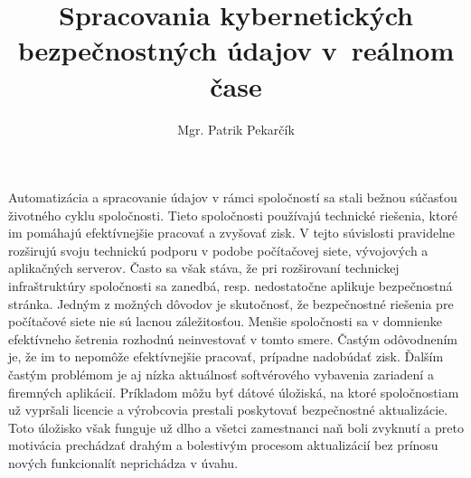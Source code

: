 \documentclass[thesismargins, thesislinespacing, openright, upjsfrontpage, combineabstracts]{rnthesis}
\title{Spracovania kybernetických bezpečnostných údajov v reálnom čase}
\author{Mgr. Patrik Pekarčík}
\begin{document}
\maketitle
\tableofcontents

\uvod



% 

Automatizácia a spracovanie údajov v rámci spoločností sa stali bežnou súčasťou životného cyklu spoločnosti. Tieto spoločnosti používajú technické riešenia, ktoré im pomáhajú efektívnejšie pracovať a zvyšovať zisk. V tejto súvislosti pravidelne rozširujú svoju technickú podporu v podobe počítačovej siete, vývojových a aplikačných serverov. Často sa však stáva, že pri rozširovaní technickej infraštruktúry spoločnosti sa zanedbá, resp. nedostatočne aplikuje bezpečnostná stránka. Jedným z možných dôvodov je skutočnosť, že bezpečnostné riešenia pre počítačové siete nie sú lacnou záležitosťou. Menšie spoločnosti sa v domnienke efektívneho šetrenia rozhodnú neinvestovať v tomto smere. Častým odôvodnením je, že im to nepomôže efektívnejšie pracovať, prípadne nadobúdať zisk. Ďalším častým problémom je aj nízka aktuálnosť softvérového vybavenia zariadení a firemných aplikácií. Príkladom môžu byť dátové úložiská, na ktoré spoločnostiam už vypršali licencie a výrobcovia prestali poskytovať bezpečnostné aktualizácie. Toto úložisko však funguje už dlho a všetci zamestnanci naň boli zvyknutí a preto motivácia prechádzať drahým a bolestivým procesom aktualizácií bez prínosu nových funkcionalít neprichádza v úvahu.
\end{document}
